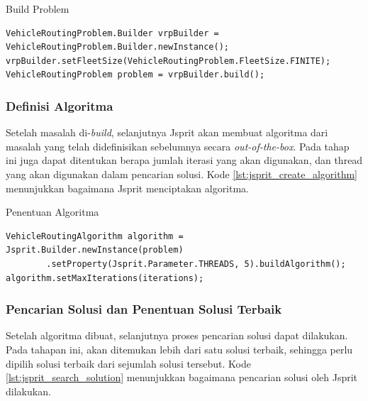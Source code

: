 \begin{listing}[!]
	\caption{Build Problem}
	\label{lst:jsprit_build_problem}
	\begin{verbatim}
VehicleRoutingProblem.Builder vrpBuilder = VehicleRoutingProblem.Builder.newInstance();
vrpBuilder.setFleetSize(VehicleRoutingProblem.FleetSize.FINITE);
VehicleRoutingProblem problem = vrpBuilder.build();
	\end{verbatim}
\end{listing}


\subsubsection{Definisi Algoritma}
Setelah masalah di-\textit{build}, selanjutnya Jsprit akan membuat algoritma dari masalah yang telah didefinisikan sebelumnya secara \textit{out-of-the-box}. Pada tahap ini juga dapat ditentukan berapa jumlah iterasi yang akan digunakan, dan thread yang akan digunakan dalam pencarian solusi. Kode \ref{lst:jsprit_create_algorithm} menunjukkan bagaimana Jsprit menciptakan algoritma.


\begin{listing}[!]
	\caption{Penentuan Algoritma}
	\label{lst:jsprit_create_algorithm}
	\begin{verbatim}
VehicleRoutingAlgorithm algorithm = Jsprit.Builder.newInstance(problem)
        .setProperty(Jsprit.Parameter.THREADS, 5).buildAlgorithm();
algorithm.setMaxIterations(iterations);
	\end{verbatim}
\end{listing}


\subsubsection{Pencarian Solusi dan Penentuan Solusi Terbaik}
Setelah algoritma dibuat, selanjutnya proses pencarian solusi dapat dilakukan. Pada tahapan ini, akan ditemukan lebih dari satu solusi terbaik, sehingga perlu dipilih solusi terbaik dari sejumlah solusi tersebut. Kode \ref{lst:jsprit_search_solution} menunjukkan bagaimana pencarian solusi oleh Jsprit dilakukan.


